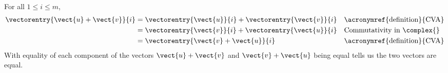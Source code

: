 For all $1\leq i\leq m$,
\begin{align*}
\vectorentry{\vect{u}+\vect{v}}{i}
&=\vectorentry{\vect{u}}{i}+\vectorentry{\vect{v}}{i}
&&\text{\acronymref{definition}{CVA}}\\
%
&=\vectorentry{\vect{v}}{i}+\vectorentry{\vect{u}}{i}
&&\text{Commutativity in $\complex{\null}$}\\
%
&=\vectorentry{\vect{v}+\vect{u}}{i}
&&\text{\acronymref{definition}{CVA}}
\end{align*}
%
With equality of each component of the vectors $\vect{u}+\vect{v}$ and $\vect{v}+\vect{u}$ being equal  tells us the two vectors are equal.
